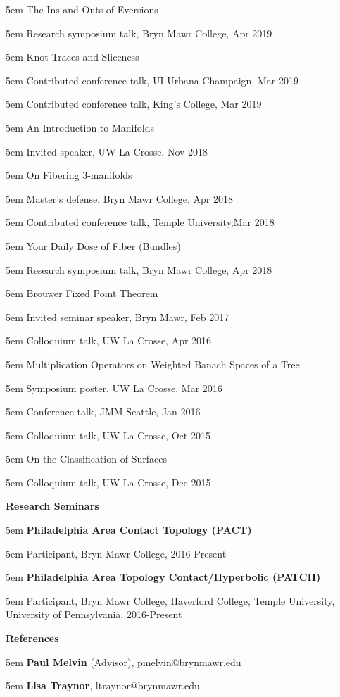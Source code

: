 \documentclass[10.5pt]{article}
\newcommand{\sectitle}[1]{{\large \textbf{#1}}\vspace{.5em}}
\newcommand{\itemreg}[1]{\begin{addmargin}[0em]{5em} #1 \end{addmargin}}
\newcommand{\itemregind}[1]{\begin{addmargin}[1em]{5em} #1 \end{addmargin}}
\newcommand{\iteminddate}[2]{\begin{addmargin}[1em]{5em}#1\end{addmargin}\vspace{-1.15em}\hfill\textit{#2}\\}
\begin{document}
\itemreg{The Ins and Outs of Eversions}
	\itemregind{Research symposium talk, Bryn Mawr College, Apr 2019}
	\vspace{.25em}
\itemreg{Knot Traces and Sliceness}
	\itemregind{Contributed conference talk, UI Urbana-Champaign, Mar 2019}
	\itemregind{Contributed conference talk, King's College, Mar 2019}
	\vspace{.25em}
\itemreg{An Introduction to Manifolds}
	\itemregind{Invited speaker, UW La Crosse, Nov 2018}
	\vspace{.25em}
\itemreg{On Fibering 3-manifolds}
	\itemregind{Master's defense, Bryn Mawr College, Apr 2018}
	\itemregind{Contributed conference talk, Temple University,Mar 2018}
	\vspace{.25em}
\itemreg{Your Daily Dose of Fiber (Bundles)}
	\itemregind{Research symposium talk, Bryn Mawr College, Apr 2018}
	\vspace{.25em}
\itemreg{Brouwer Fixed Point Theorem}
	\itemregind{Invited seminar speaker, Bryn Mawr, Feb 2017}
	\itemregind{Colloquium talk, UW La Crosse, Apr 2016}
	\vspace{.25em}
\itemreg{Multiplication Operators on Weighted Banach Spaces of a Tree}
	\itemregind{Symposium poster, UW La Crosse, Mar 2016}
	\itemregind{Conference talk, JMM Seattle, Jan 2016}
	\itemregind{Colloquium talk, UW La Crosse, Oct 2015}
	\vspace{.25em}
\itemreg{On the Classification of Surfaces}
	\itemregind{Colloquium talk, UW La Crosse, Dec 2015}
\vspace{25em}



\sectitle{Research Seminars}

\itemreg{\textbf{Philadelphia Area Contact Topology (PACT)}}
	\itemregind{Participant, Bryn Mawr College,  2016-Present}
\vspace{.35em}
\itemreg{\textbf{Philadelphia Area Topology Contact/Hyperbolic (PATCH)}}
	\itemregind{Participant, Bryn Mawr College, Haverford College, Temple University, University of Pennsylvania, 2016-Present}
\vspace{2em}



\sectitle{References}

\itemreg{\textbf{Paul Melvin} (Advisor), pmelvin@brynmawr.edu}
\itemreg{\textbf{Lisa Traynor}, ltraynor@brynmawr.edu}


		
\end{document}
